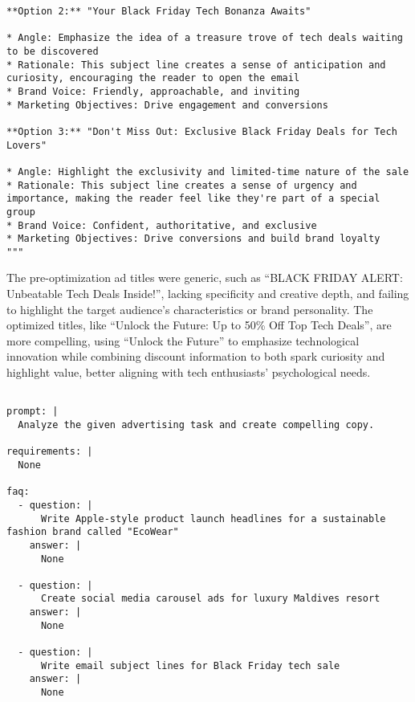 \begin{tcolorbox}[title={\textbf{\small Performance After Optimization}}, boxrule=2pt, arc=0mm, breakable]
\begin{verbatim}
**Option 2:** "Your Black Friday Tech Bonanza Awaits"

* Angle: Emphasize the idea of a treasure trove of tech deals waiting to be discovered
* Rationale: This subject line creates a sense of anticipation and curiosity, encouraging the reader to open the email
* Brand Voice: Friendly, approachable, and inviting
* Marketing Objectives: Drive engagement and conversions

**Option 3:** "Don't Miss Out: Exclusive Black Friday Deals for Tech Lovers"

* Angle: Highlight the exclusivity and limited-time nature of the sale
* Rationale: This subject line creates a sense of urgency and importance, making the reader feel like they're part of a special group
* Brand Voice: Confident, authoritative, and exclusive
* Marketing Objectives: Drive conversions and build brand loyalty
"""

\end{verbatim}
\end{tcolorbox}

The pre-optimization ad titles were generic, such as ``BLACK FRIDAY ALERT: Unbeatable Tech Deals Inside!'', lacking specificity and creative depth, and failing to highlight the target audience's characteristics or brand personality. The optimized titles, like ``Unlock the Future: Up to 50\% Off Top Tech Deals'', are more compelling, using ``Unlock the Future'' to emphasize technological innovation while combining discount information to both spark curiosity and highlight value, better aligning with tech enthusiasts' psychological needs.

\begin{tcolorbox}[title={\textbf{\small Iteration template on the BBH-navigate dataset}}, boxrule=2pt, arc=0mm, breakable]\begin{verbatim}

prompt: |
  Analyze the given advertising task and create compelling copy.

requirements: |
  None

faq:
  - question: |
      Write Apple-style product launch headlines for a sustainable fashion brand called "EcoWear"
    answer: |
      None

  - question: |
      Create social media carousel ads for luxury Maldives resort
    answer: |
      None

  - question: |
      Write email subject lines for Black Friday tech sale
    answer: |
      None

\end{verbatim}
\end{tcolorbox}

